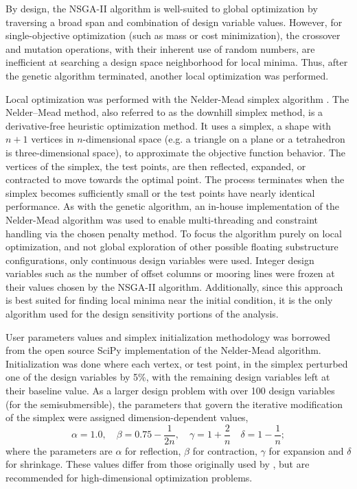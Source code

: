 By design, the NSGA-II algorithm is well-suited to global optimization
by traversing a broad span and combination of design variable values.
However, for single-objective optimization (such as mass or cost
minimization), the crossover and mutation operations, with their
inherent use of random numbers, are inefficient at searching a design
space neighborhood for local minima.  Thus, after the genetic algorithm
terminated, another local optimization was performed.

Local optimization was performed with the Nelder-Mead simplex algorithm
\citep{neldermead}.  The Nelder–Mead method, also referred to as the
downhill simplex method, is a derivative-free heuristic optimization
method.  It uses a simplex, a shape with $n+1$ vertices in
$n$-dimensional space (e.g. a triangle on a plane or a tetrahedron is
three-dimensional space), to approximate the objective function
behavior.  The vertices of the simplex, the test points, are then
reflected, expanded, or contracted to move towards the optimal point.
The process terminates when the simplex becomes sufficiently small or
the test points have nearly identical performance.  As with the genetic
algorithm, an in-house implementation of the Nelder-Mead algorithm was used
to enable multi-threading and constraint handling via the chosen penalty
method.  To focus the algorithm purely on local optimization, and not
global exploration of other possible floating substructure
configurations, only continuous design variables were used.  Integer
design variables such as the number of offset columns or mooring lines
were frozen at their values chosen by the NSGA-II algorithm.
Additionally, since this approach is best suited for finding local
minima near the initial condition, it is the only algorithm used for the
design sensitivity portions of the analysis.

User parameters values and simplex initialization methodology was
borrowed from the open source SciPy implementation of the Nelder-Mead
algorithm.  Initialization was done where each vertex, or test point, in
the simplex perturbed one of the design variables by 5\%, with the
remaining design variables left at their baseline value.  As a larger
design problem with over 100 design variables (for the semisubmersible),
the parameters that govern the iterative modification of the simplex
were assigned dimension-dependent values,
\begin{equation}
\alpha = 1.0, \quad \beta = 0.75 - \frac{1}{2n}, \quad \gamma = 1+\frac{2}{n} 
\quad \delta = 1 - \frac{1}{n};
\end{equation}
where the parameters are $\alpha$ for reflection, $\beta$ for
contraction, $\gamma$ for expansion and $\delta$ for shrinkage. These
values differ from those originally used by \citet{neldermead}, but are
recommended for high-dimensional optimization problems.

